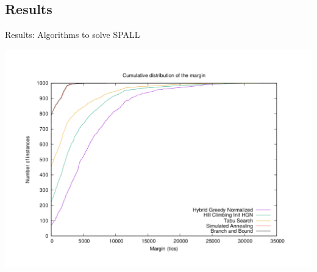 \documentclass[10 pt]{beamer}
\begin{document}
\subsection{Results}
\begin{frame}{Results: Algorithms to solve SPALL}
\begin{center}
	\includegraphics[width=\linewidth]{all8routes}

\end{center}
\end{frame}
\end{document}
